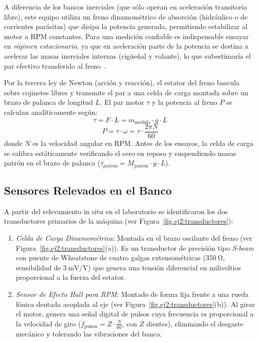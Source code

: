 A diferencia de los bancos inerciales (que sólo operan en aceleración transitoria libre), este equipo utiliza un freno
dinamométrico de absorción (hidráulico o de corrientes parásitas) que disipa la potencia generada, permitiendo estabilizar
al motor a RPM constantes. Para una medición confiable es indispensable ensayar en \emph{régimen estacionario}, ya que
en aceleración parte de la potencia se destina a acelerar las masas inerciales internas (cigüeñal y volante), lo que
subestimaría el par efectivo transferido al freno~\cite{barreiro_banco}.

Por la tercera ley de Newton (acción y reacción), el estator del freno bascula sobre cojinetes libres y transmite el par
a una celda de carga montada sobre un brazo de palanca de longitud $L$. El par motor $\tau$ y la potencia al freno $P$ se
calculan analíticamente según:
\begin{equation}
    \tau = F \cdot L = m_{\text{medida}} \cdot g \cdot L
    \label{eq.ej2:torque}
\end{equation}
\begin{equation}
    P = \tau \cdot \omega = \tau \cdot \frac{2 \pi N}{60}
    \label{eq.ej2:potencia}
\end{equation}
donde $N$ es la velocidad angular en RPM. Antes de los ensayos, la celda de carga se calibra estáticamente verificando el
cero en reposo y suspendiendo masas patrón en el brazo de palanca ($\tau_{\text{patrón}} = M_{\text{patrón}} \cdot g \cdot L$).

\subsection{Sensores Relevados en el Banco}
A partir del relevamiento in situ en el laboratorio se identificaron los dos transductores primarios de la máquina
(ver Figura~\ref{fig.ej2:transductores}):
\begin{enumerate}
    \item \emph{Celda de Carga Dinamométrica}: Montada en el brazo oscilante del freno (ver Figura~\ref{fig.ej2:transductores}(a)).
    Es un transductor de precisión tipo \emph{S-beam} con puente de Wheatstone de cuatro galgas extensométricas ($\qty{350}{\ohm}$,
    sensibilidad de $\qty{3}{\milli\volt\per\volt}$) que genera una tensión diferencial en milivoltios proporcional a la
    fuerza del estator.
    \item \emph{Sensor de Efecto Hall para RPM}: Montado de forma fija frente a una rueda fónica dentada acoplada al eje
    (ver Figura~\ref{fig.ej2:transductores}(b)). Al girar el motor, genera una señal digital de pulsos cuya frecuencia es
    proporcional a la velocidad de giro ($f_{\text{pulsos}} = Z \cdot \frac{N}{60}$, con $Z$ dientes), eliminando el desgaste
    mecánico y tolerando las vibraciones del banco.
\end{enumerate}

